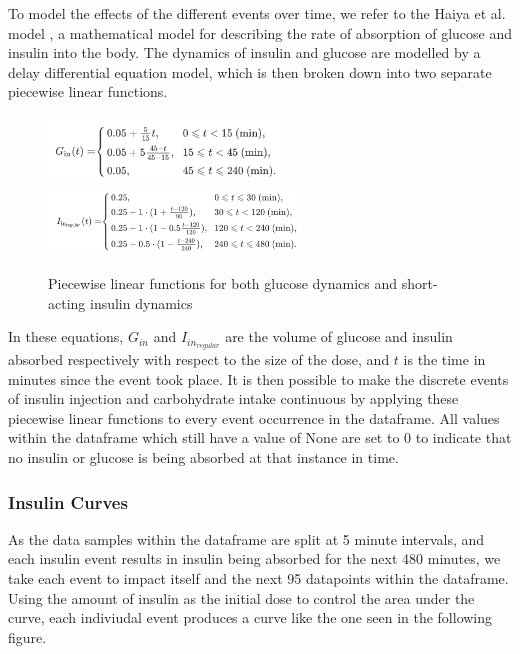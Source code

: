           To model the effects of the different events over time, we refer to the Haiya et al. model \cite{haiya}, a mathematical model for describing the rate of absorption of glucose and insulin into the body. The dynamics of insulin and glucose are modelled by a delay differential equation \cite{delayDe} model, which is then broken down into two separate piecewise linear functions.

          \begin{figure}[H]
            \centering
            \includegraphics[width=0.55\textwidth]{images/CarbIntakeDE.png} 
            \includegraphics[width=0.6\textwidth]{images/InsulinDE.png} 
            \caption{
             Piecewise linear functions for both glucose dynamics and short-acting insulin dynamics \cite{haiya}
            }
          \end{figure}

          In these equations, $G_{in}$ and $I_{in_{regular}}$ are the volume of glucose and insulin absorbed respectively with respect to the size of the dose, and $t$ is the time in minutes since the event took place. It is then possible to make the discrete events of insulin injection and carbohydrate intake continuous by applying these piecewise linear functions to every event occurrence in the dataframe. All values within the dataframe which still have a value of None are set to 0 to indicate that no insulin or glucose is being absorbed at that instance in time.

          \subsubsection{Insulin Curves}
          As the data samples within the dataframe are split at 5 minute intervals, and each insulin event results in insulin being absorbed for the next 480 minutes, we take each event to impact itself and the next 95 datapoints within the dataframe. Using the amount of insulin as the initial dose to control the area under the curve, each indiviudal event produces a curve like the one seen in the following figure.
          

